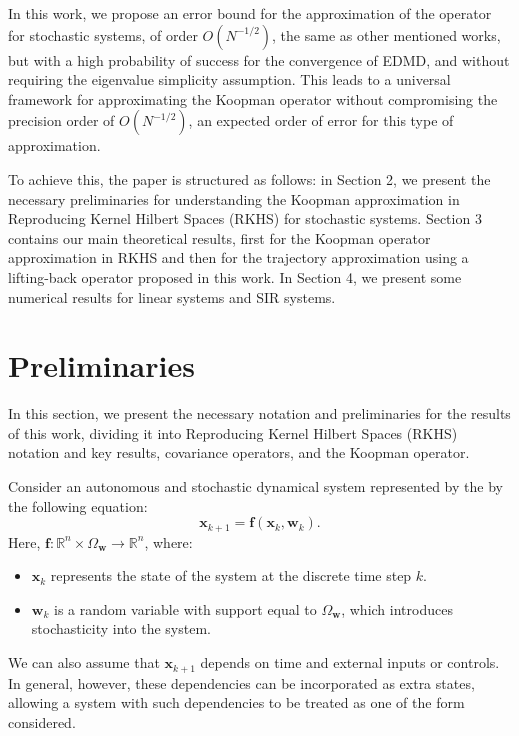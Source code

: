 \documentclass{article}
\newcommand{\R}{\mathbb{R}} %
\begin{document}
In this work, we propose an error bound for the approximation of the operator for stochastic systems, of order $O(N^{-1/2})$, the same as other mentioned works, but with a high probability of success for the convergence of EDMD, and without requiring the eigenvalue simplicity assumption. This leads to a universal framework for approximating the Koopman operator without compromising the precision order of $O(N^{-1/2})$, an expected order of error for this type of approximation.

To achieve this, the paper is structured as follows: in Section 2, we present the necessary preliminaries for understanding the Koopman approximation in Reproducing Kernel Hilbert Spaces (RKHS) for stochastic systems. Section 3 contains our main theoretical results, first for the Koopman operator approximation in RKHS and then for the trajectory approximation using a lifting-back operator proposed in this work. In Section 4, we present some numerical results for linear systems and SIR systems.  

\section{Preliminaries}
In this section, we present the necessary notation and preliminaries for the results of this work, dividing it into Reproducing Kernel Hilbert Spaces (RKHS) notation and key results, covariance operators, and the Koopman operator.

Consider an autonomous and stochastic dynamical system represented by the
by the following equation:
\begin{equation}
    \mathbf{x}_{k+1} = \mathbf{f}\left(\mathbf{x}_k, \mathbf{w}_k\right).
    \label{eq:dyn_sys}
\end{equation}
Here, $\mathbf{f}: \R^n \times \Omega_\mathbf{w} \to \R^n$, where:
\begin{itemize}
    \item $\mathbf{x}_k$ represents the state of the system at the discrete time step
$k$.
    \item $\mathbf{w}_k$ is a random variable with support equal to
$\Omega_\mathbf{w}$, which introduces stochasticity into the system.
\end{itemize}

We can also assume that $\mathbf{x}_{k+1}$ depends on time and external inputs or controls. In general, however, these dependencies can be incorporated as extra states, allowing a system with such dependencies to be treated as one of the form considered.
\end{document}

